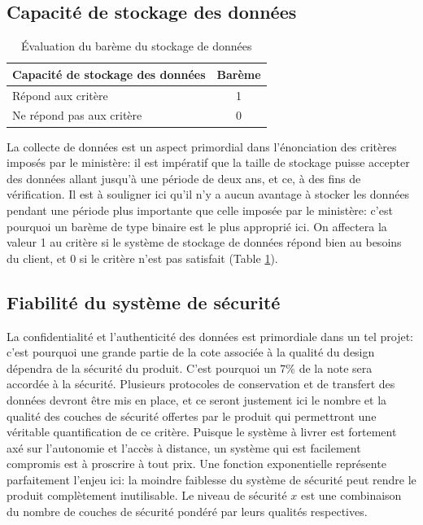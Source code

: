 \subsection{Capacité de stockage des données}
\label{subsection:capacite_stockage}

\begin{table}
   \begin{tabular}{|p{4cm}|c|}
        \hline
        Capacité de stockage des données & Barème\\
        \hline
        Répond aux critère & 1 \\
        \hline
        Ne répond pas aux critère & 0 \\
        \hline
   \end{tabular}
   \caption{Évaluation du barème du stockage de données}
   \label{t:bareme_stockage}
\end{table}

La collecte de données est un aspect primordial dans l'énonciation des critères imposés par le ministère: il est impératif que la taille de stockage puisse accepter des données allant jusqu'à une période de deux ans, et ce, à des fins de vérification. Il est à souligner ici qu'il n'y a aucun avantage à stocker les données pendant une période plus importante que celle imposée par le ministère: c'est pourquoi un barème de type binaire est le plus approprié ici. On affectera la valeur 1 au critère si le système de stockage de données répond bien au besoins du client, et 0 si le critère n'est pas satisfait (Table \ref{t:bareme_stockage}).

\subsection{Fiabilité du système de sécurité}


La confidentialité et l'authenticité des données est primordiale dans un tel projet: c'est pourquoi une grande partie de la cote associée à la qualité du design dépendra de la sécurité du produit. C'est pourquoi un 7\% de la note sera accordée à la sécurité. Plusieurs protocoles de conservation et de transfert des données devront être mis en place, et ce seront justement ici le nombre et la qualité des couches de sécurité offertes par le produit qui permettront une véritable quantification de ce critère. Puisque le système à livrer est fortement axé sur l'autonomie et l'accès à distance, un système qui est facilement compromis est à proscrire à tout prix. Une fonction exponentielle représente parfaitement l'enjeu ici: la moindre faiblesse du système de sécurité peut rendre le produit complètement inutilisable. Le niveau de sécurité $x$ est une combinaison du nombre de couches de sécurité pondéré par leurs qualités respectives.


